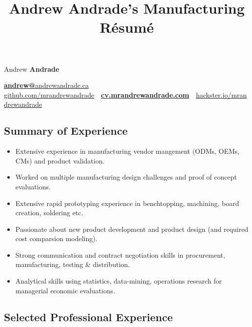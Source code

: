 \documentclass[pdftex,11pt,letterpaper]{article}
\title{Andrew Andrade's Manufacturing Résumé}
\begin{document}
\font

\begin{center}
  {\Huge Andrew \textbf{Andrade}}

  {\large
    \href{mailto:andrew@andrewandrade.ca}{\textbf{andrew@}}\href{http://andrewandrade.ca}{andrewandrade.ca} \\ 

    \href{https://github.com/mrandrewandrade}{github.com/mrandrewandrade}\ \textperiodcentered \ \href{http://cv.mrandrewandrade.com}{\textbf{cv.mrandrewandrade.com}}\ \textperiodcentered \ \href{https://www.hackster.io/mrandrewandrade}{hackster.io/mrandrewandrade}
  }
\end{center}

\subsection*{Summary of Experience}

\begin{itemize}[before=,after=]

\item Extensive experience in manufacturing vendor mangement (ODMs, OEMs, CMs) and product validation.
  
\item Worked on multiple manufacturing design challenges and proof of concept evaluations.

\item Extensive rapid prototyping experience in benchtopping, machining, board creation, soldering etc.

\item Passionate about new product development and product design (and required cost comparsion modeling).

\item Strong communication and contract negotiation skills in procurement, manufacturing, testing \& distribution.

\item Analytical skills using statistics, data-mining, operations research for managerial economic evaluations.

\end{itemize}

\subsection*{Selected Professional Experience}
\end{document}
